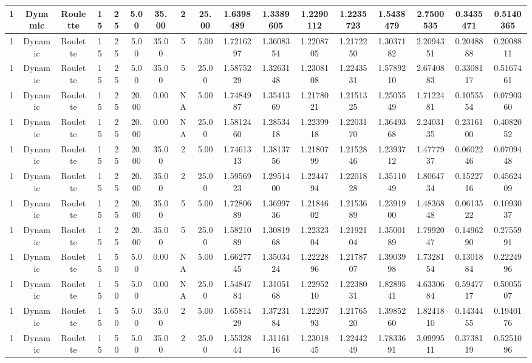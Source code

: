 \begin{longtable}{ | c | c | c | c | c | c | c | c | c | c | c | c | c | c | c | c | c | }
	\hline
	1	&	Dynamic	&	Roulette	&	15	&	25	&	5.00	&	35.00	&	2	&	25.00	&	1.6398489	&	1.3389605	&	1.2290112	&	1.2235723	&	1.5438479	&	2.7500535	&	0.3435471	&	0.5140365 \\
	\hline
	1	&	Dynamic	&	Roulette	&	15	&	25	&	5.00	&	35.00	&	5	&	5.00	&	1.7216297	&	1.3608354	&	1.2208705	&	1.2172250	&	1.3037182	&	2.2094351	&	0.2048888	&	0.2008811 \\
	\hline
	1	&	Dynamic	&	Roulette	&	15	&	25	&	5.00	&	35.00	&	5	&	25.00	&	1.5875229	&	1.3263148	&	1.2308108	&	1.2243531	&	1.5789210	&	2.6740883	&	0.3308117	&	0.5167461 \\
	\hline
	1	&	Dynamic	&	Roulette	&	15	&	25	&	20.00	&	0.00	&	NA	&	5.00	&	1.7484987	&	1.3541369	&	1.2178021	&	1.2151325	&	1.2505549	&	1.7122481	&	0.1055554	&	0.0790360 \\
	\hline
	1	&	Dynamic	&	Roulette	&	15	&	25	&	20.00	&	0.00	&	NA	&	25.00	&	1.5812460	&	1.2853418	&	1.2239918	&	1.2203170	&	1.3649368	&	2.2403135	&	0.2316100	&	0.4082052 \\
	\hline
	1	&	Dynamic	&	Roulette	&	15	&	25	&	20.00	&	35.00	&	2	&	5.00	&	1.7461313	&	1.3813756	&	1.2180799	&	1.2152846	&	1.2393712	&	1.4777937	&	0.0602246	&	0.0709448 \\
	\hline
	1	&	Dynamic	&	Roulette	&	15	&	25	&	20.00	&	35.00	&	2	&	25.00	&	1.5956923	&	1.2951400	&	1.2244794	&	1.2201828	&	1.3511049	&	1.8064734	&	0.1522716	&	0.4562409 \\
	\hline
	1	&	Dynamic	&	Roulette	&	15	&	25	&	20.00	&	35.00	&	5	&	5.00	&	1.7280689	&	1.3699736	&	1.2184602	&	1.2153689	&	1.2391900	&	1.4836848	&	0.0613522	&	0.1093037 \\
	\hline
	1	&	Dynamic	&	Roulette	&	15	&	25	&	20.00	&	35.00	&	5	&	25.00	&	1.5821089	&	1.3081968	&	1.2232304	&	1.2192104	&	1.3500189	&	1.7992047	&	0.1496290	&	0.2755991 \\
	\hline
	1	&	Dynamic	&	Roulette	&	15	&	50	&	5.00	&	0.00	&	NA	&	5.00	&	1.6627745	&	1.3503424	&	1.2222896	&	1.2178707	&	1.3903998	&	1.7328154	&	0.1301884	&	0.2224996 \\
	\hline
	1	&	Dynamic	&	Roulette	&	15	&	50	&	5.00	&	0.00	&	NA	&	25.00	&	1.5484784	&	1.3105168	&	1.2295210	&	1.2238031	&	1.8289541	&	4.6330684	&	0.5947717	&	0.5005507 \\
	\hline
	1	&	Dynamic	&	Roulette	&	15	&	50	&	5.00	&	35.00	&	2	&	5.00	&	1.6581429	&	1.3723184	&	1.2220793	&	1.2176520	&	1.3985260	&	1.8241810	&	0.1434455	&	0.1940176 \\
	\hline
	1	&	Dynamic	&	Roulette	&	15	&	50	&	5.00	&	35.00	&	2	&	25.00	&	1.5532844	&	1.3116116	&	1.2301845	&	1.2244249	&	1.7833691	&	3.0999511	&	0.3738119	&	0.5251096 \\

\end{longtable}
